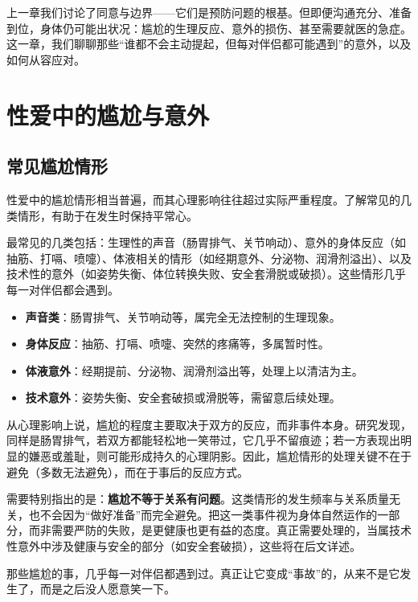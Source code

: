 \documentclass[12pt,UTF8]{ctexbook}
\newcommand{\keyword}[1]{\textbf{#1}}
\begin{document}
上一章我们讨论了同意与边界——它们是预防问题的根基。但即便沟通充分、准备到位，身体仍可能出状况：尴尬的生理反应、意外的损伤、甚至需要就医的急症。这一章，我们聊聊那些“谁都不会主动提起，但每对伴侣都可能遇到”的意外，以及如何从容应对。

\section{性爱中的尴尬与意外}

\subsection{常见尴尬情形}

性爱中的尴尬情形相当普遍，而其心理影响往往超过实际严重程度。了解常见的几类情形，有助于在发生时保持平常心。

最常见的几类包括：生理性的声音（肠胃排气、关节响动）、意外的身体反应（如抽筋、打嗝、喷嚏）、体液相关的情形（如经期意外、分泌物、润滑剂溢出）、以及技术性的意外（如姿势失衡、体位转换失败、安全套滑脱或破损）。这些情形几乎每一对伴侣都会遇到。

\begin{itemize}
  \item \keyword{声音类}：肠胃排气、关节响动等，属完全无法控制的生理现象。
  \item \keyword{身体反应}：抽筋、打嗝、喷嚏、突然的疼痛等，多属暂时性。
  \item \keyword{体液意外}：经期提前、分泌物、润滑剂溢出等，处理上以清洁为主。
  \item \keyword{技术意外}：姿势失衡、安全套破损或滑脱等，需留意后续处理。
\end{itemize}

从心理影响上说，尴尬的程度主要取决于双方的反应，而非事件本身。研究发现，同样是肠胃排气，若双方都能轻松地一笑带过，它几乎不留痕迹；若一方表现出明显的嫌恶或羞耻，则可能形成持久的心理阴影。因此，尴尬情形的处理关键不在于避免（多数无法避免），而在于事后的反应方式。

需要特别指出的是：\keyword{尴尬不等于关系有问题}。这类情形的发生频率与关系质量无关，也不会因为“做好准备”而完全避免。把这一类事件视为身体自然运作的一部分，而非需要严防的失败，是更健康也更有益的态度。真正需要处理的，当属技术性意外中涉及健康与安全的部分（如安全套破损），这些将在后文详述。

\begin{tcolorbox}[colback=pink!5!white,colframe=red!50!black,title=贴心小叮咛]
那些尴尬的事，几乎每一对伴侣都遇到过。真正让它变成“事故”的，从来不是它发生了，而是之后没人愿意笑一下。
\end{tcolorbox}
\end{document}
